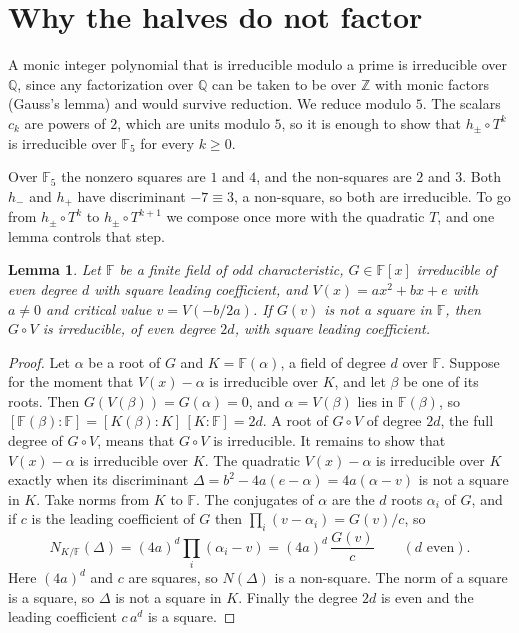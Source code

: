 \documentclass[11pt]{article}
\newtheorem{lemma}{Lemma}
\theoremstyle{remark}
\newcommand{\F}{\mathbb{F}}
\begin{document}
\section{Why the halves do not factor}

A monic integer polynomial that is irreducible modulo a prime is irreducible over $\mathbb Q$, since any factorization over $\mathbb Q$ can be taken to be over $\mathbb Z$ with monic factors (Gauss's lemma) and would survive reduction. We reduce modulo $5$. The scalars $c_k$ are powers of $2$, which are units modulo $5$, so it is enough to show that $h_\pm\circ T^{k}$ is irreducible over $\F_5$ for every $k\ge0$.

Over $\F_5$ the nonzero squares are $1$ and $4$, and the non-squares are $2$ and $3$. Both $h_-$ and $h_+$ have discriminant $-7\equiv3$, a non-square, so both are irreducible. To go from $h_\pm\circ T^{k}$ to $h_\pm\circ T^{k+1}$ we compose once more with the quadratic $T$, and one lemma controls that step.

\begin{lemma}\label{lem:comp}
Let $\F$ be a finite field of odd characteristic, $G\in\F[x]$ irreducible of even degree $d$ with square leading coefficient, and $V(x)=ax^2+bx+e$ with $a\ne0$ and critical value $v=V(-b/2a)$. If $G(v)$ is not a square in $\F$, then $G\circ V$ is irreducible, of even degree $2d$, with square leading coefficient.
\end{lemma}

\begin{proof}
Let $\alpha$ be a root of $G$ and $K=\F(\alpha)$, a field of degree $d$ over $\F$. Suppose for the moment that $V(x)-\alpha$ is irreducible over $K$, and let $\beta$ be one of its roots. Then $G(V(\beta))=G(\alpha)=0$, and $\alpha=V(\beta)$ lies in $\F(\beta)$, so $[\F(\beta):\F]=[K(\beta):K]\,[K:\F]=2d$. A root of $G\circ V$ of degree $2d$, the full degree of $G\circ V$, means that $G\circ V$ is irreducible. It remains to show that $V(x)-\alpha$ is irreducible over $K$. The quadratic $V(x)-\alpha$ is irreducible over $K$ exactly when its discriminant $\Delta=b^2-4a(e-\alpha)=4a(\alpha-v)$ is not a square in $K$. Take norms from $K$ to $\F$. The conjugates of $\alpha$ are the $d$ roots $\alpha_i$ of $G$, and if $c$ is the leading coefficient of $G$ then $\prod_i(v-\alpha_i)=G(v)/c$, so
\[
N_{K/\F}(\Delta)=(4a)^d\prod_i(\alpha_i-v)=(4a)^d\,\frac{G(v)}{c}\qquad(d\text{ even}).
\]
Here $(4a)^d$ and $c$ are squares, so $N(\Delta)$ is a non-square. The norm of a square is a square, so $\Delta$ is not a square in $K$. Finally the degree $2d$ is even and the leading coefficient $c\,a^d$ is a square.
\end{proof}
\end{document}
